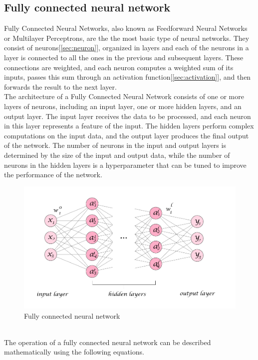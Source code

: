 \documentclass[a4paper, noexaminfo]{sapthesis}
\begin{document}
\subsection{Fully connected neural network}
Fully Connected Neural Networks, also known as Feedforward Neural Networks
or Multilayer Perceptrons, are the the most basic type of neural networks.
They consist of neurons[\ref{sec:neuron}], organized in layers and each of
 the neurons in a layer
 is connected to all the ones in the previous and subsequent layers. 
These connections are weighted, and each neuron computes a weighted sum of its inputs, passes
  this sum through an activation function[\ref{sec:activation}], and then forwards the result to
 the next layer.\newline \\
The architecture of a Fully Connected Neural Network consists of one or
 more layers of neurons, including an input layer, one or more hidden 
 layers, and an output layer. The input layer receives the data to be
  processed, and each neuron in this layer represents a feature of the 
  input. The hidden layers perform complex computations on the input data,
and the output layer produces the final output of the network. The 
number of neurons in the input and output layers is determined by the
size of the input and output data, while the number of neurons in the
hidden layers is a hyperparameter that can be tuned to improve the
performance of the network.
\begin{figure}[h]
\includegraphics[scale=0.5]{fully_connected_nn}
\centering
\caption{Fully connected neural network}\label{fig:fully_connected}

\end{figure}\newline \\
The operation of a fully connected neural network can be described 
mathematically using the following equations.
\end{document}
